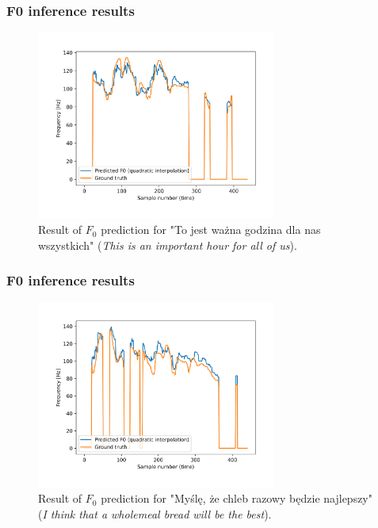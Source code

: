 \documentclass[a4paper,9pt]{beamer}
\theoremstyle{mytheoremstyle}
\begin{document}
\begin{frame}
\frametitle{F0 inference results}
\begin{figure}
\begin{center}
  \includegraphics[width=0.7\textwidth]{res/amu_pl_ilo_BAZA_2006C_C0278_simple_pred_freq}
\end{center}
	\caption{Result of $F_0$ prediction for "To jest wa\.zna godzina dla nas wszystkich" (\textit{This is an important hour for all of us}).}
\end{figure}
\end{frame}

\begin{frame}
\frametitle{F0 inference results}
\begin{figure}
\begin{center}
  \includegraphics[width=0.7\textwidth]{res/amu_pl_ilo_BAZA_2006C_C0362_simple_pred_freq}
\end{center}
	\caption{Result of $F_0$ prediction for "My\'sl\k{e}, \.ze chleb razowy b\k{e}dzie najlepszy" (\textit{I think that a wholemeal bread will be the best}).}
\end{figure}
\end{frame}
\end{document}
